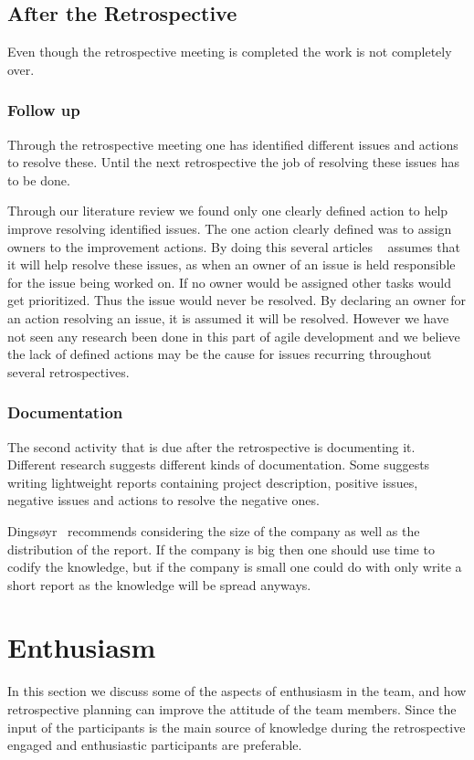 \documentclass[12pt]{article}
\begin{document}
\subsection{After the Retrospective}
Even though the retrospective meeting is completed the work is not completely over. 

\subsubsection{Follow up}
Through the retrospective meeting one has identified different issues and actions to resolve these. Until the next retrospective the job of resolving these issues has to be done. 

Through our literature review we found only one clearly defined action to help improve resolving identified issues. The one action clearly defined was to assign owners to the improvement actions. By doing this several articles ~\cite{Collier1996,Drury2012} assumes that it will help resolve these issues, as when an owner of an issue is held responsible for the issue being worked on. If no owner would be assigned other tasks would get prioritized. Thus the issue would never be resolved. By declaring an owner for an action resolving an issue, it is assumed it will be resolved. However we have not seen any research been done in this part of agile development and we believe the lack of defined actions may be the cause for issues recurring throughout several retrospectives. 

\subsubsection{Documentation}
The second activity that is due after the retrospective is documenting it. Different research suggests different kinds of documentation. Some suggests ~\cite{Collier1996} writing lightweight reports containing project description, positive issues, negative issues and actions to resolve the negative ones. 

Dingsøyr~\cite{Dingsoyr2005} recommends considering the size of the company as well as the distribution of the report. If the company is big then one should use time to codify the knowledge, but if the company is small one could do with only write a short report as the knowledge will be spread anyways. 

\section{Enthusiasm}
In this section we discuss some of the aspects of enthusiasm in the team, and how retrospective planning can improve the attitude of the team members. Since the input of the participants is the main source of knowledge during the retrospective engaged and enthusiastic participants are preferable. 
\end{document}
